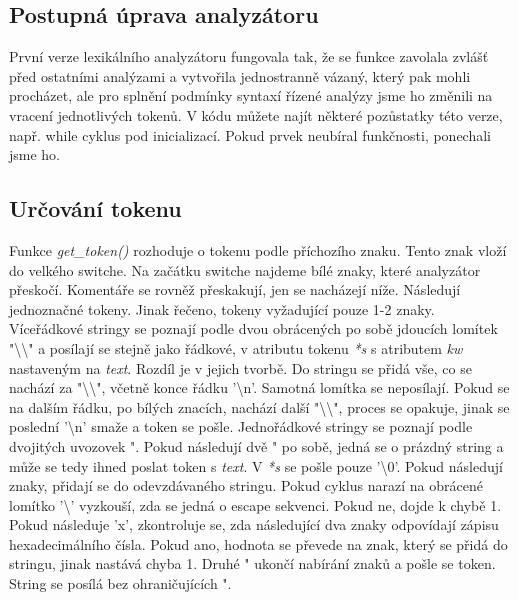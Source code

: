 \documentclass[a4paper, 12pt]{article}
\begin{document}
\subsection{Postupná úprava analyzátoru}
První verze lexikálního analyzátoru fungovala tak, že se funkce zavolala zvlášť před ostatními analýzami a vytvořila jednostranně vázaný, který pak mohli procházet, ale pro splnění podmínky syntaxí řízené analýzy jsme ho změnili na vracení jednotlivých tokenů. V kódu můžete najít některé pozůstatky této verze, např. while cyklus pod inicializací. Pokud prvek neubíral funkčnosti, ponechali jsme ho.

\subsection{Určování tokenu}
Funkce \textit{get\_token()} rozhoduje o tokenu podle příchozího znaku. Tento znak vloží do velkého switche.\newline
Na začátku switche najdeme bílé znaky, které analyzátor přeskočí. Komentáře se rovněž přeskakují, jen se nacházejí níže.\newline
Následují jednoznačné tokeny. Jinak řečeno, tokeny vyžadující pouze 1-2 znaky.\newline
Víceřádkové stringy se poznají podle dvou obrácených po sobě jdoucích lomítek "\textbackslash\textbackslash" a posílají se stejně jako řádkové, v atributu tokenu \textit{*s} s atributem \textit{kw} nastaveným na \textit{text}. Rozdíl je v jejich tvorbě. Do stringu se přidá vše, co se nachází za "\textbackslash\textbackslash", včetně konce řádku '\textbackslash n'. Samotná lomítka se neposílají. Pokud se na dalším řádku, po bílých znacích, nachází další "\textbackslash\textbackslash", proces se opakuje, jinak se poslední '\textbackslash n' smaže a token se pošle.\newline
Jednořádkové stringy se poznají podle dvojitých uvozovek ". Pokud následují dvě " po sobě, jedná se o prázdný string a může se tedy ihned poslat token s \textit{text}. V \textit{*s} se pošle pouze '\textbackslash0'. Pokud následují znaky, přidají se do odevzdávaného stringu. Pokud cyklus narazí na obrácené lomítko '\textbackslash' vyzkouší, zda se jedná o escape sekvenci. Pokud ne, dojde k chybě 1. Pokud následuje 'x', zkontroluje se, zda následující dva znaky odpovídají zápisu hexadecimálního čísla. Pokud ano, hodnota se převede na znak, který se přidá do stringu, jinak nastává chyba 1. Druhé " ukončí nabírání znaků a pošle se token. String se posílá bez ohraničujících ".\newline
\end{document}
